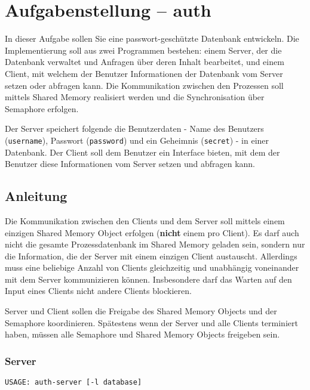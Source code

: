 



\section*{Aufgabenstellung -- auth}

In dieser Aufgabe sollen Sie eine passwort-geschützte Datenbank entwickeln. Die
Implementierung soll aus zwei Programmen bestehen: einem Server, der die
Datenbank verwaltet und Anfragen über deren Inhalt bearbeitet, und einem
Client, mit welchem der Benutzer Informationen der Datenbank vom Server setzen
oder abfragen kann. Die Kommunikation zwischen den Prozessen soll mittels
Shared Memory realisiert werden und die Synchronisation über Semaphore
erfolgen.

Der Server speichert folgende die Benutzerdaten - Name des Benutzers
(\texttt{username}), Passwort (\texttt{password}) und ein Geheimnis
(\texttt{secret}) - in einer Datenbank. Der Client soll dem Benutzer ein
Interface bieten, mit dem der Benutzer diese Informationen vom Server setzen
und abfragen kann.

\subsection*{Anleitung}

Die Kommunikation zwischen den Clients und dem Server soll mittels einem
einzigen Shared Memory Object erfolgen (\textbf{nicht} einem pro Client). Es
darf auch nicht die gesamte Prozessdatenbank im Shared Memory geladen sein,
sondern nur die Information, die der Server mit einem einzigen Client
austauscht. Allerdings muss eine beliebige Anzahl von Clients gleichzeitig und
unabhängig voneinander mit dem Server kommunizieren können. Insbesondere darf
das Warten auf den Input eines Clients nicht andere Clients blockieren.

Server und Client sollen die Freigabe des Shared Memory Objects und der
Semaphore koordinieren. Spätestens wenn der Server und alle Clients terminiert
haben, müssen alle Semaphore und Shared Memory Objects freigeben sein.

\subsubsection*{Server}
\begin{verbatim}
USAGE: auth-server [-l database]
\end{verbatim}

